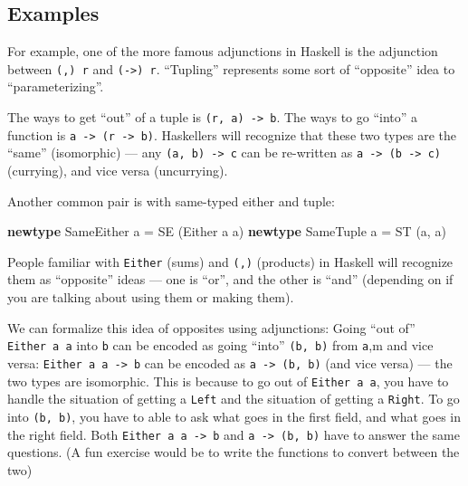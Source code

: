 \documentclass[]{article}
\newenvironment{Shaded}{}{}
\newcommand{\DataTypeTok}[1]{\textcolor[rgb]{0.56,0.13,0.00}{#1}}
\newcommand{\KeywordTok}[1]{\textcolor[rgb]{0.00,0.44,0.13}{\textbf{#1}}}
\newcommand{\NormalTok}[1]{#1}
\newcommand{\OtherTok}[1]{\textcolor[rgb]{0.00,0.44,0.13}{#1}}
\begin{document}
\hypertarget{examples}{%
\subsection{Examples}\label{examples}}

For example, one of the more famous adjunctions in Haskell is the adjunction
between \texttt{(,)\ r} and \texttt{(-\textgreater{})\ r}. ``Tupling''
represents some sort of ``opposite'' idea to ``parameterizing''.

The ways to get ``out'' of a tuple is \texttt{(r,\ a)\ -\textgreater{}\ b}. The
ways to go ``into'' a function is
\texttt{a\ -\textgreater{}\ (r\ -\textgreater{}\ b)}. Haskellers will recognize
that these two types are the ``same'' (isomorphic) --- any
\texttt{(a,\ b)\ -\textgreater{}\ c} can be re-written as
\texttt{a\ -\textgreater{}\ (b\ -\textgreater{}\ c)} (currying), and vice versa
(uncurrying).

Another common pair is with same-typed either and tuple:

\begin{Shaded}
\begin{Highlighting}[]
\KeywordTok{newtype} \DataTypeTok{SameEither}\NormalTok{ a }\OtherTok{=} \DataTypeTok{SE}\NormalTok{ (}\DataTypeTok{Either}\NormalTok{ a a)}
\KeywordTok{newtype} \DataTypeTok{SameTuple}\NormalTok{  a }\OtherTok{=} \DataTypeTok{ST}\NormalTok{ (a, a)}
\end{Highlighting}
\end{Shaded}

People familiar with \texttt{Either} (sums) and \texttt{(,)} (products) in
Haskell will recognize them as ``opposite'' ideas --- one is ``or'', and the
other is ``and'' (depending on if you are talking about using them or making
them).

We can formalize this idea of opposites using adjunctions: Going ``out of''
\texttt{Either\ a\ a} into \texttt{b} can be encoded as going ``into''
\texttt{(b,\ b)} from \texttt{a},m and vice versa:
\texttt{Either\ a\ a\ -\textgreater{}\ b} can be encoded as
\texttt{a\ -\textgreater{}\ (b,\ b)} (and vice versa) --- the two types are
isomorphic. This is because to go out of \texttt{Either\ a\ a}, you have to
handle the situation of getting a \texttt{Left} and the situation of getting a
\texttt{Right}. To go into \texttt{(b,\ b)}, you have to able to ask what goes
in the first field, and what goes in the right field. Both
\texttt{Either\ a\ a\ -\textgreater{}\ b} and
\texttt{a\ -\textgreater{}\ (b,\ b)} have to answer the same questions. (A fun
exercise would be to write the functions to convert between the two)
\end{document}
